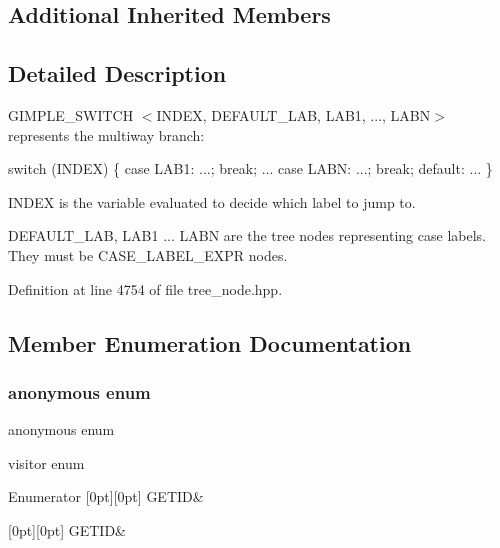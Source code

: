 \subsection*{Additional Inherited Members}


\subsection{Detailed Description}
G\+I\+M\+P\+L\+E\+\_\+\+S\+W\+I\+T\+CH $<$I\+N\+D\+EX, D\+E\+F\+A\+U\+L\+T\+\_\+\+L\+AB, L\+A\+B1, ..., L\+A\+BN$>$ represents the multiway branch\+: 

switch (I\+N\+D\+EX) \{ case L\+A\+B1\+: ...; break; ... case L\+A\+BN\+: ...; break; default\+: ... \}

I\+N\+D\+EX is the variable evaluated to decide which label to jump to.

D\+E\+F\+A\+U\+L\+T\+\_\+\+L\+AB, L\+A\+B1 ... L\+A\+BN are the tree nodes representing case labels. They must be C\+A\+S\+E\+\_\+\+L\+A\+B\+E\+L\+\_\+\+E\+X\+PR nodes. 

Definition at line 4754 of file tree\+\_\+node.\+hpp.



\subsection{Member Enumeration Documentation}
\mbox{\label{structgimple__switch_afaff8b796085b8db2df523a19ff7f78f}} 
\subsubsection{\texorpdfstring{anonymous enum}{anonymous enum}}
{\footnotesize\ttfamily anonymous enum}



visitor enum 

\begin{DoxyEnumFields}{Enumerator}
[0pt][0pt]{}\mbox{\label{structgimple__switch_afaff8b796085b8db2df523a19ff7f78fa3d59fde1ff5f424fe2cd0e29ffa149ce}} 
G\+E\+T\+ID&\\
\hline

[0pt][0pt]{}\mbox{\label{structgimple__switch_afaff8b796085b8db2df523a19ff7f78fa3d59fde1ff5f424fe2cd0e29ffa149ce}} 
G\+E\+T\+ID&\\
\hline

\end{DoxyEnumFields}


